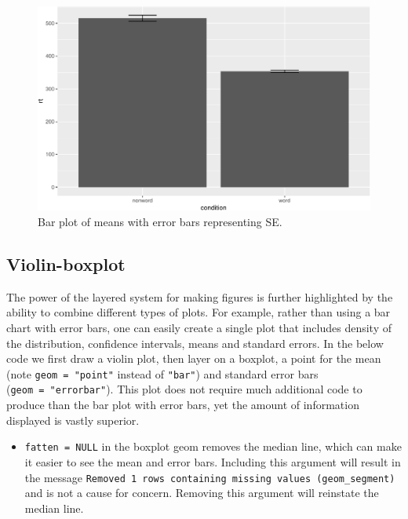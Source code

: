 \documentclass[
  english,
  doc,floatsintext]{apa6}
\providecommand{\tightlist}{%
  \setlength{\itemsep}{0pt}\setlength{\parskip}{0pt}}
\begin{document}
\begin{figure}

{\centering \includegraphics[width=1\linewidth]{images/badbar2-1} 

}

\caption{Bar plot of means with error bars representing SE.}\label{fig:badbar2}
\end{figure}

\hypertarget{violin-boxplot}{%
\subsection{Violin-boxplot}\label{violin-boxplot}}

The power of the layered system for making figures is further highlighted by the ability to combine different types of plots. For example, rather than using a bar chart with error bars, one can easily create a single plot that includes density of the distribution, confidence intervals, means and standard errors. In the below code we first draw a violin plot, then layer on a boxplot, a point for the mean (note \texttt{geom\ =\ "point"} instead of \texttt{"bar"}) and standard error bars (\texttt{geom\ =\ "errorbar"}). This plot does not require much additional code to produce than the bar plot with error bars, yet the amount of information displayed is vastly superior.

\begin{itemize}
\tightlist
\item
  \texttt{fatten\ =\ NULL} in the boxplot geom removes the median line, which can make it easier to see the mean and error bars. Including this argument will result in the message \texttt{Removed\ 1\ rows\ containing\ missing\ values\ (geom\_segment)} and is not a cause for concern. Removing this argument will reinstate the median line.
\end{itemize}
\end{document}
